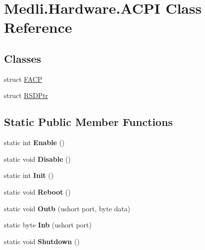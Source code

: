\hypertarget{class_medli_1_1_hardware_1_1_a_c_p_i}{}\section{Medli.\+Hardware.\+A\+C\+PI Class Reference}
\label{class_medli_1_1_hardware_1_1_a_c_p_i}
\subsection*{Classes}
\begin{DoxyCompactItemize}
\item 
struct \hyperlink{struct_medli_1_1_hardware_1_1_a_c_p_i_1_1_f_a_c_p}{F\+A\+CP}
\item 
struct \hyperlink{struct_medli_1_1_hardware_1_1_a_c_p_i_1_1_r_s_d_ptr}{R\+S\+D\+Ptr}
\end{DoxyCompactItemize}
\subsection*{Static Public Member Functions}
\begin{DoxyCompactItemize}
\item 
\mbox{\label{class_medli_1_1_hardware_1_1_a_c_p_i_a50d69c770a9d01ee5d5362da55c01526}} 
static int {\bfseries Enable} ()
\item 
\mbox{\label{class_medli_1_1_hardware_1_1_a_c_p_i_a08bd2d9feb9ae1deca34a498b0ed232f}} 
static void {\bfseries Disable} ()
\item 
\mbox{\label{class_medli_1_1_hardware_1_1_a_c_p_i_a5d3cd56ccafda017569f882283493fe9}} 
static int {\bfseries Init} ()
\item 
\mbox{\label{class_medli_1_1_hardware_1_1_a_c_p_i_af5c63cc3b56453f706f22001c72e412e}} 
static void {\bfseries Reboot} ()
\item 
\mbox{\label{class_medli_1_1_hardware_1_1_a_c_p_i_a61301f225813ae5c92a515e99f4785ae}} 
static void {\bfseries Outb} (ushort port, byte data)
\item 
\mbox{\label{class_medli_1_1_hardware_1_1_a_c_p_i_a2ab49b57ca91a4e03c343484d24e390e}} 
static byte {\bfseries Inb} (ushort port)
\item 
\mbox{\label{class_medli_1_1_hardware_1_1_a_c_p_i_a083e2c4928b114a6279fb6723e19d6de}} 
static void {\bfseries Shutdown} ()
\end{DoxyCompactItemize}
